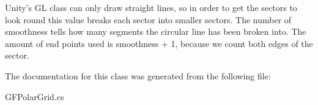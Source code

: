 Unity's G\+L class can only draw straight lines, so in order to get the sectors to look round this value breaks each sector into smaller sectors. The number of smoothness tells how many segments the circular line has been broken into. The amount of end points used is smoothness + 1, because we count both edges of the sector. 

The documentation for this class was generated from the following file\+:\begin{DoxyCompactItemize}
\item 
G\+F\+Polar\+Grid.\+cs\end{DoxyCompactItemize}
